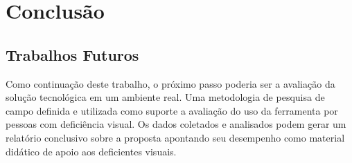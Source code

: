 \chapter[Conclusão]{Conclusão}\label{cap5}




\section{Trabalhos Futuros}

Como continuação deste trabalho, o próximo passo poderia ser a avaliação da solução tecnológica em um ambiente real. Uma metodologia de pesquisa de campo definida e utilizada como suporte a avaliação do uso da ferramenta por pessoas com deficiência visual. Os dados coletados e analisados podem gerar um relatório conclusivo sobre a proposta apontando seu desempenho como material didático de apoio aos deficientes visuais.